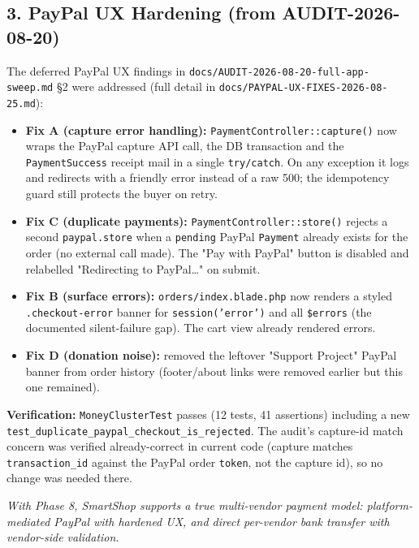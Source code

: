 \documentclass[12pt,a4paper]{article}
\begin{document}
\subsection{3. PayPal UX Hardening (from AUDIT-2026-08-20)}

The deferred PayPal UX findings in \texttt{docs/AUDIT-2026-08-20-full-app-sweep.md} \S2 were addressed (full detail in \texttt{docs/PAYPAL-UX-FIXES-2026-08-25.md}):

\begin{itemize}
    \item \textbf{Fix A (capture error handling):} \texttt{PaymentController::capture()} now wraps the PayPal capture API call, the DB transaction and the \texttt{PaymentSuccess} receipt mail in a single \texttt{try/catch}. On any exception it logs and redirects with a friendly error instead of a raw 500; the idempotency guard still protects the buyer on retry.
    \item \textbf{Fix C (duplicate payments):} \texttt{PaymentController::store()} rejects a second \texttt{paypal.store} when a \texttt{pending} PayPal \texttt{Payment} already exists for the order (no external call made). The "Pay with PayPal" button is disabled and relabelled "Redirecting to PayPal…" on submit.
    \item \textbf{Fix B (surface errors):} \texttt{orders/index.blade.php} now renders a styled \texttt{.checkout-error} banner for \texttt{session('error')} and all \texttt{\$errors} (the documented silent-failure gap). The cart view already rendered errors.
    \item \textbf{Fix D (donation noise):} removed the leftover "Support Project" PayPal banner from order history (footer/about links were removed earlier but this one remained).
\end{itemize}

\textbf{Verification:} \texttt{MoneyClusterTest} passes (12 tests, 41 assertions) including a new \texttt{test\_duplicate\_paypal\_checkout\_is\_rejected}. The audit's capture-id match concern was verified already-correct in current code (capture matches \texttt{transaction\_id} against the PayPal order \texttt{token}, not the capture id), so no change was needed there.

\vfill
\begin{center}
    \textit{With Phase 8, SmartShop supports a true multi-vendor payment model: platform-mediated PayPal with hardened UX, and direct per-vendor bank transfer with vendor-side validation.}
\end{center}
\end{document}
